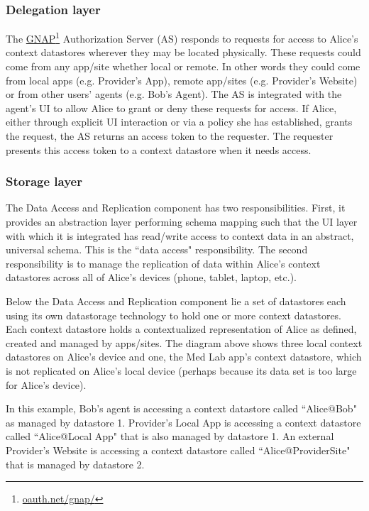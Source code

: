 \documentclass[11pt, oneside]{article}   	%
\newcommand{\hyperfootnote}[1][]{\def\ArgI{{#1}}\hyperfootnoteRelay}
\newcommand\hyperfootnoteRelay[2][]{\href{#1#2}{\ArgI}\footnote{\href{#1#2}{#2}}}
\begin{document}
\subsubsection{Delegation layer}

The \hyperfootnote[GNAP][https://]{oauth.net/gnap/} Authorization Server (AS) responds to requests for access to Alice's context datastores wherever they may be located physically. These requests could come from any app/site whether local or remote. In other words they could come from local apps (e.g. Provider's App), remote app/sites (e.g. Provider's Website) or from other users' agents (e.g. Bob's Agent). The AS is integrated with the agent's UI to allow Alice to grant or deny these requests for access. If Alice, either through explicit UI interaction or via a policy she has established, grants the request, the AS returns an access token to the requester. The requester presents this access token to a context datastore when it needs access. 

\subsubsection{Storage layer}

The Data Access and Replication component has two responsibilities. First, it provides an abstraction layer performing schema mapping such that the UI layer with which it is integrated has read/write access to context data in an abstract, universal schema. This is the ``data access" responsibility. The second responsibility is to manage the replication of data within Alice's context datastores across all of Alice's devices (phone, tablet, laptop, etc.). 

Below the Data Access and Replication component lie a set of datastores each using its own datastorage technology to hold one or more context datastores. Each context datastore holds a contextualized representation of Alice as defined, created and managed by apps/sites. The diagram above shows three local context datastores on Alice's device and one, the Med Lab app's context datastore, which is not replicated on Alice's local device (perhaps because its data set is too large for Alice's device).

In this example, Bob's agent is accessing a context datastore called ``Alice@Bob" as managed by datastore 1. Provider's Local App is accessing a context datastore called ``Alice@Local App" that is also managed by datastore 1.  An external Provider's Website is accessing a context datastore called ``Alice@ProviderSite" that is managed by datastore 2. 
\end{document}
